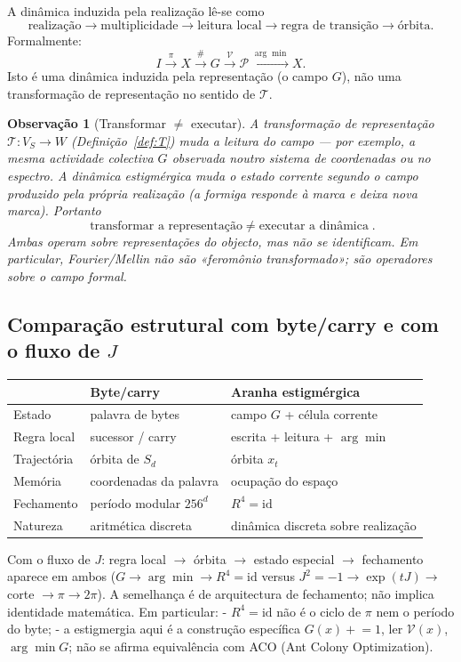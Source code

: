 \documentclass[11pt,a4paper]{article}
\newtheorem{observacao}{Observação}
\begin{document}
A dinâmica induzida pela realização lê-se como
\[
\boxed{\text{realização}\to\text{multiplicidade}\to\text{leitura local}\to\text{regra de transição}\to\text{órbita}}.
\]
Formalmente:
\[
I\xrightarrow{\pi}X\xrightarrow{\#}G\xrightarrow{\mathcal V}\mathcal P\xrightarrow{\arg\min}X.
\]
Isto é uma dinâmica induzida pela representação (o campo \(G\)), não uma transformação de representação no sentido de \(\mathcal T\).

\begin{observacao}[Transformar \(\neq\) executar]
A transformação de representação \(\mathcal T\colon V_S\to W\) (Definição~\ref{def:T}) muda a leitura do campo --- por exemplo, a mesma actividade colectiva \(G\) observada noutro sistema de coordenadas ou no espectro. A dinâmica estigmérgica muda o estado corrente segundo o campo produzido pela própria realização (a formiga responde à marca e deixa nova marca). Portanto
\[
\boxed{\text{transformar a representação}\;\neq\;\text{executar a dinâmica}}.
\]
Ambas operam sobre representações do objecto, mas não se identificam. Em particular, Fourier/Mellin não são «feromônio transformado»; são operadores sobre o campo formal.
\end{observacao}

\subsection{Comparação estrutural com byte/carry e com o fluxo de \(J\)}

\begin{center}
\small
\begin{tabular}{@{}p{}p{}p{}@{}}
\toprule
 & Byte/carry & Aranha estigmérgica \\
\midrule
Estado & palavra de bytes & campo \(G\) + célula corrente \\
Regra local & sucessor / carry & escrita + leitura + \(\arg\min\) \\
Trajectória & órbita de \(S_d\) & órbita \(x_t\) \\
Memória & coordenadas da palavra & ocupação do espaço \\
Fechamento & período modular \(256^d\) & \(R^4=\mathrm{id}\) \\
Natureza & aritmética discreta & dinâmica discreta sobre realização \\
\bottomrule
\end{tabular}
\end{center}

Com o fluxo de \(J\): regra local \(\to\) órbita \(\to\) estado especial \(\to\) fechamento aparece em ambos (\(G\to\arg\min\to R^4=\mathrm{id}\) versus \(J^2=-1\to\exp(tJ)\to\) corte \(\to\pi\to 2\pi\)). A semelhança é de arquitectura de fechamento; não implica identidade matemática. Em particular:
- \(R^4=\mathrm{id}\) não é o ciclo de \(\pi\) nem o período do byte;
- a estigmergia aqui é a construção específica \(G(x)\mathrel{+}=1\), ler \(\mathcal V(x)\), \(\arg\min G\); não se afirma equivalência com ACO (Ant Colony Optimization).
\end{document}

